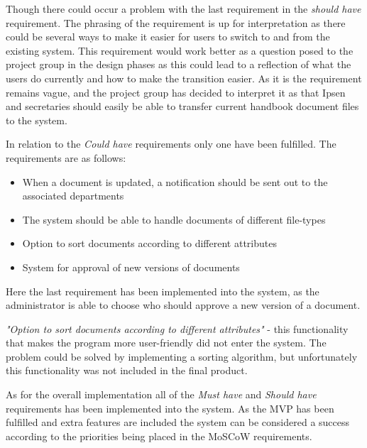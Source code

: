 Though there could occur a problem with the last requirement in the \textit{should have} requirement.
The phrasing of the requirement is up for interpretation as there could be several ways to make it easier for users to switch to and from the existing system.
This requirement would work better as a question posed to the project group in the design phases as this could lead to a reflection of what the users do currently and how to make the transition easier.
As it is the requirement remains vague, and the project group has decided to interpret it as that Ipsen and secretaries should easily be able to transfer current handbook document files to the system.

In relation to the \textit{Could have} requirements only one have been fulfilled.
The requirements are as follows:

 \begin{itemize}
 	\item
    When a document is updated, a notification should be sent out to the associated departments
	\item
    The system should be able to handle documents of different file-types
    \item
    Option to sort documents according to different attributes
    \item
    System for approval of new versions of documents
\end{itemize}

Here the last requirement has been implemented into the system, as the administrator is able to choose who should approve a new version of a document.

\textit{"Option to sort documents according to different attributes"} - this functionality that makes the program more user-friendly did not enter the system.
The problem could be solved by implementing a sorting algorithm, but unfortunately this functionality was not included in the final product.

As for the overall implementation all of the \textit{Must have} and \textit{Should have} requirements has been implemented into the system.
As the MVP has been fulfilled and extra features are included the system can be considered a success according to the priorities being placed in the MoSCoW requirements.


